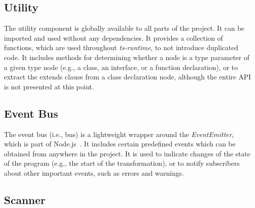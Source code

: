 \subsection{Utility}
\label{sec:utility}

The utility component is globally available to all parts of the project. It can be imported and used without any dependencies. It provides a collection of functions, which are used throughout \emph{ts-runtime}, to not introduce duplicated code. It includes methods for determining whether a node is a type parameter of a given type node (e.g., a class, an interface, or a function declaration), or to extract the extends clause from a class declaration node, although the entire API is not presented at this point.

\subsection{Event Bus}
\label{sec:bus}

The event bus (i.e., bus) is a lightweight wrapper around the \emph{EventEmitter}, which is part of Node.js~\cite{Node:API:Events}. It includes certain predefined events which can be obtained from anywhere in the project. It is used to indicate changes of the state of the program (e.g., the start of the transformation), or to notify subscribers about other important events, such as errors and warnings.

\subsection{Scanner}
\label{sec:scanner}

